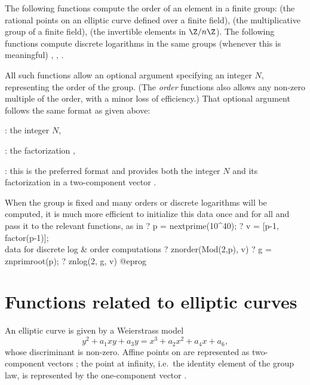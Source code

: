 \label{se:DLfun}

The following functions compute the order of an element in a finite group:
 (the rational points on an elliptic curve defined over a
finite field),  (the multiplicative group of a finite field),
 (the invertible elements in $\Z/n\Z$). The following functions
compute discrete logarithms in the same groups (whenever this is meaningful)
, , .

All such functions allow an optional argument specifying an integer
$N$, representing the order of the group. (The \emph{order} functions also
allows any non-zero multiple of the order, with a minor loss of efficiency.)
That optional argument follows the same format as given above:

\item {}: the integer $N$,

\item {}: the factorization ,

\item {}: this is the preferred format and provides both the
integer $N$ and its factorization in a two-component vector
\kbd{[$N$, fa]}.

When the group is fixed and many orders or discrete logarithms will be
computed, it is much more efficient to initialize this data once and for all
and pass it to the relevant functions, as in
\bprog
? p = nextprime(10^40);
? v = [p-1, factor(p-1)]; \\ data for discrete log & order computations
? znorder(Mod(2,p), v)
? g = znprimroot(p);
? znlog(2, g, v)
@eprog
\bigskip


\section{Functions related to elliptic curves}

An elliptic curve is given by a Weierstrass model
$$
  y^2+a_1xy+a_3y=x^3+a_2x^2+a_4x+a_6,
$$
whose discriminant is non-zero. Affine points on  are represented as
two-component vectors \kbd{[x,y]}; the point at infinity, i.e.~the identity
element of the group law, is represented by the one-component vector
\kbd{[0]}.

